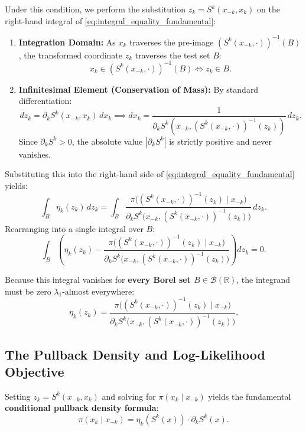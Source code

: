 \documentclass[11pt,a4paper]{article}
\theoremstyle{plain}
\theoremstyle{definition}
\theoremstyle{remark}
\begin{document}
Under this condition, we perform the substitution $z_k = S^k(x_{-k}, x_k)$ on the right-hand integral of \eqref{eq:integral_equality_fundamental}:
\begin{enumerate}
    \item \textbf{Integration Domain:} As $x_k$ traverses the pre-image $(S^k(x_{-k}, \cdot))^{-1}(B)$, the transformed coordinate $z_k$ traverses the test set $B$:
    \[
        x_k \in (S^k(x_{-k}, \cdot))^{-1}(B) \iff z_k \in B.
    \]
    \item \textbf{Infinitesimal Element (Conservation of Mass):} By standard differentiation:
    \[
        dz_k = \partial_k S^k(x_{-k}, x_k) \, dx_k \implies dx_k = \frac{1}{\partial_k S^k(x_{-k}, (S^k(x_{-k}, \cdot))^{-1}(z_k))} \, dz_k.
    \]
    Since $\partial_k S^k > 0$, the absolute value $|\partial_k S^k|$ is strictly positive and never vanishes.
\end{enumerate}

Substituting this into the right-hand side of \eqref{eq:integral_equality_fundamental} yields:
\begin{equation}
    \int_B \eta_k(z_k) \, dz_k = \int_B \frac{\pi\Big( (S^k(x_{-k}, \cdot))^{-1}(z_k) \;\Big|\; x_{-k} \Big)}{\partial_k S^k\Big( x_{-k}, (S^k(x_{-k}, \cdot))^{-1}(z_k) \Big)} \, dz_k.
\end{equation}
Rearranging into a single integral over $B$:
\begin{equation}
    \int_B \left( \eta_k(z_k) - \frac{\pi\Big( (S^k(x_{-k}, \cdot))^{-1}(z_k) \;\Big|\; x_{-k} \Big)}{\partial_k S^k\Big( x_{-k}, (S^k(x_{-k}, \cdot))^{-1}(z_k) \Big)} \right) dz_k = 0.
\end{equation}

Because this integral vanishes for \textbf{every Borel set $B \in \mathcal{B}(\mathbb{R})$}, the integrand must be zero $\lambda_1$-almost everywhere:
\begin{equation}
    \eta_k(z_k) = \frac{\pi\Big( (S^k(x_{-k}, \cdot))^{-1}(z_k) \;\Big|\; x_{-k} \Big)}{\partial_k S^k\Big( x_{-k}, (S^k(x_{-k}, \cdot))^{-1}(z_k) \Big)}.
\end{equation}

\subsection{The Pullback Density and Log-Likelihood Objective}

Setting $z_k = S^k(x_{-k}, x_k)$ and solving for $\pi(x_k \mid x_{-k})$ yields the fundamental \textbf{conditional pullback density formula}:
\begin{equation}
    \pi(x_k \mid x_{-k}) = \eta_k\left( S^k(x) \right) \cdot \partial_k S^k(x).
    \label{eq:pullback_density_result}
\end{equation}
\end{document}
